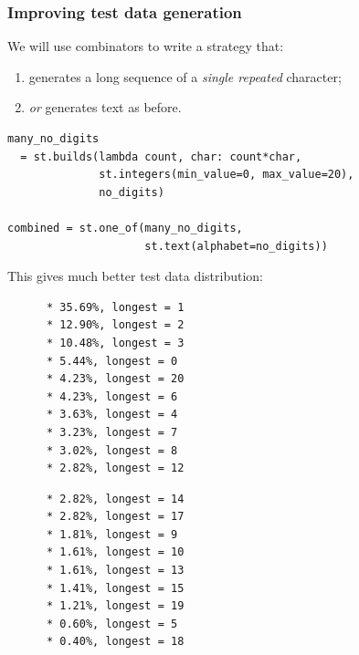 \documentclass{beamer}
\begin{document}
\begin{frame}
  \frametitle{Improving test data generation}

  We will use \alert{combinators} to write a strategy that:
  \begin{enumerate}
\item generates a long sequence of a \emph{single repeated} character;
\item \emph{or} generates text as before.
\end{enumerate}
\bigskip

\begin{verbatim}
many_no_digits
  = st.builds(lambda count, char: count*char,
              st.integers(min_value=0, max_value=20),
              no_digits)

combined = st.one_of(many_no_digits,
                     st.text(alphabet=no_digits))
\end{verbatim}

\framebreak

This gives much better test data distribution:

\begin{center}
\begin{minipage}{0.5\textwidth}
{\small\begin{verbatim}
      * 35.69%, longest = 1
      * 12.90%, longest = 2
      * 10.48%, longest = 3
      * 5.44%, longest = 0
      * 4.23%, longest = 20
      * 4.23%, longest = 6
      * 3.63%, longest = 4
      * 3.23%, longest = 7
      * 3.02%, longest = 8
      * 2.82%, longest = 12
\end{verbatim}}
\end{minipage}\begin{minipage}{0.45\textwidth}
{\small\begin{verbatim}
      * 2.82%, longest = 14
      * 2.82%, longest = 17
      * 1.81%, longest = 9
      * 1.61%, longest = 10
      * 1.61%, longest = 13
      * 1.41%, longest = 15
      * 1.21%, longest = 19
      * 0.60%, longest = 5
      * 0.40%, longest = 18
\end{verbatim}}
\end{minipage}
\end{center}

\end{frame}
\end{document}
